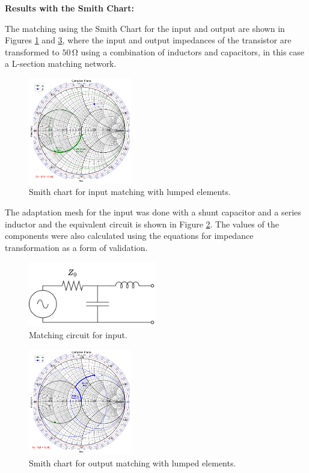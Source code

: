 \vspace{0.4cm}
\textbf{Results with the Smith Chart:}
\vspace{0.4cm}

The matching using the Smith Chart for the input and output are shown in Figures \ref{fig:zs-LC-matching} and \ref{fig:zl-LC-matching}, where the input and output impedances of the transistor are transformed to $50\,\si{\ohm}$ using a combination of inductors and capacitors, in this case a L-section matching network.

\begin{figure}[H]
    \centering
    \includegraphics[width=0.4\textwidth]{Images/zs-lc-match.png}
    \caption{Smith chart for input matching with lumped elements.}
    \label{fig:zs-LC-matching}
\end{figure}

The adaptation mesh for the input was done with a shunt capacitor and a series inductor and the equivalent circuit is shown in Figure \ref{fig:MatchingCircuit-input}. The values of the components were also calculated using the equations for impedance transformation as a form of validation.

\begin{figure}[H]
    \centering
    \includegraphics[width=0.5\textwidth]{Images/Input-matching-circuit.png}
    \caption{Matching circuit for input.}
    \label{fig:MatchingCircuit-input}
\end{figure}

\begin{figure}[H]
    \centering
    \includegraphics[width=0.4\textwidth]{Images/zl-lc-match.png}
    \caption{Smith chart for output matching with lumped elements.}
    \label{fig:zl-LC-matching}
\end{figure}


